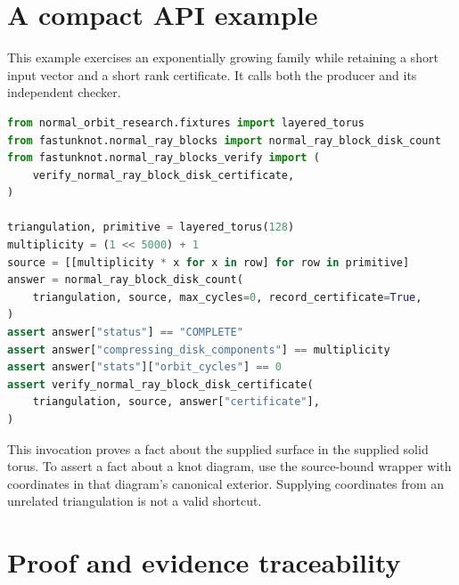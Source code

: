 \section{A compact API example}

This example exercises an exponentially growing family while retaining a
short input vector and a short rank certificate.  It calls both the producer
and its independent checker.

\begin{lstlisting}[language=Python]
from normal_orbit_research.fixtures import layered_torus
from fastunknot.normal_ray_blocks import normal_ray_block_disk_count
from fastunknot.normal_ray_blocks_verify import (
    verify_normal_ray_block_disk_certificate,
)

triangulation, primitive = layered_torus(128)
multiplicity = (1 << 5000) + 1
source = [[multiplicity * x for x in row] for row in primitive]
answer = normal_ray_block_disk_count(
    triangulation, source, max_cycles=0, record_certificate=True,
)
assert answer["status"] == "COMPLETE"
assert answer["compressing_disk_components"] == multiplicity
assert answer["stats"]["orbit_cycles"] == 0
assert verify_normal_ray_block_disk_certificate(
    triangulation, source, answer["certificate"],
)
\end{lstlisting}

This invocation proves a fact about the supplied surface in the supplied
solid torus.  To assert a fact about a knot diagram, use the source-bound
wrapper with coordinates in that diagram's canonical exterior.  Supplying
coordinates from an unrelated triangulation is not a valid shortcut.

\clearpage
\section{Proof and evidence traceability}

